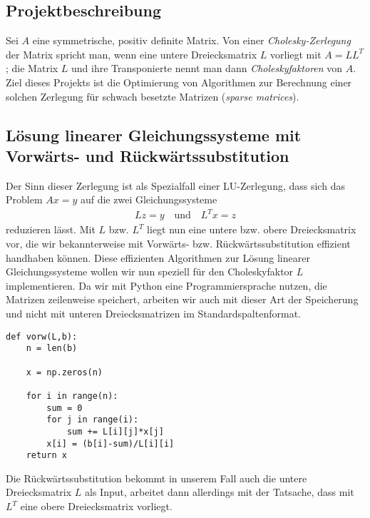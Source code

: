 \subsection{Projektbeschreibung}

Sei $A$ eine symmetrische, positiv definite Matrix. Von einer \textit{Cholesky-Zerlegung} der Matrix spricht man, wenn eine untere Dreiecksmatrix
$L$ vorliegt mit $A = LL^{T}$; die Matrix $L$ und ihre Transponierte nennt man dann \textit{Choleskyfaktoren} von $A$. Ziel dieses Projekts ist die Optimierung von Algorithmen zur Berechnung einer solchen Zerlegung für schwach besetzte Matrizen (\textit{sparse matrices}).
\newline

\subsection{Lösung linearer Gleichungssysteme mit Vorwärts- und Rückwärtssubstitution}

Der Sinn dieser Zerlegung ist als Spezialfall einer LU-Zerlegung, dass sich das Problem $Ax=y$ auf die zwei Gleichungssysteme
\begin{align*}
    Lz = y \text{~~~und~~~} L^{T}x=z
\end{align*}
reduzieren lässt. Mit $L$ bzw. $L^{T}$ liegt nun eine untere bzw. obere Dreiecksmatrix vor, die wir bekannterweise mit Vorwärts- bzw. Rückwärtssubstitution effizient handhaben können.
Diese effizienten Algorithmen zur Lösung linearer Gleichungssysteme wollen wir nun speziell für den Choleskyfaktor $L$ implementieren. Da wir mit Python eine Programmiersprache nutzen, die Matrizen zeilenweise speichert, arbeiten wir auch mit dieser Art der Speicherung und nicht mit unteren Dreiecksmatrizen im Standardspaltenformat.

\lstset{language=Python}
\lstset{frame=lines}
\lstset{basicstyle=\footnotesize}
\begin{lstlisting}
def vorw(L,b):
    n = len(b)

    x = np.zeros(n)

    for i in range(n):
        sum = 0
        for j in range(i):
            sum += L[i][j]*x[j]
        x[i] = (b[i]-sum)/L[i][i]
    return x
\end{lstlisting}

Die Rückwärtssubstitution bekommt in unserem Fall auch die untere Dreiecksmatrix $L$ als Input, arbeitet dann allerdings mit der Tatsache, dass mit $L^{T}$ eine obere Dreiecksmatrix vorliegt.

